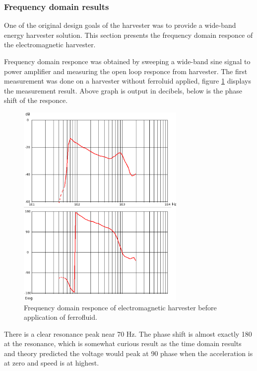 \subsubsection{Frequency domain results} 
One of the original design goals of the harvester was to provide a wide-band energy harvester solution. This section presents the frequency domain responce of the electromagnetic harvester.

Frequency domain responce was obtained by sweeping a wide-band sine signal to power amplifier and measuring the open loop responce from harvester. The first measurement was done on a harvester without ferroluid applied, figure \ref{fig:inductive_fd_dry} displays the measurement result. Above graph is output in decibels, below is the phase shift of the responce.

\begin{figure}[htb]
\begin{center}
\includegraphics[height=10cm]{images/own_measurement/generator_shaker/inductive_fd_dry.png}
\end{center}
\caption{\label{fig:inductive_fd_dry} Frequency domain responce of electromagnetic harvester before application of ferrofluid.}
\end{figure}

There is a clear resonance peak near 70 Hz. The phase shift is almost exactly 180 \degree at the resonance, which is somewhat curious result as the time domain results and theory predicted the voltage would peak at 90 \degree phase when the acceleration is at zero and speed is at highest. 

